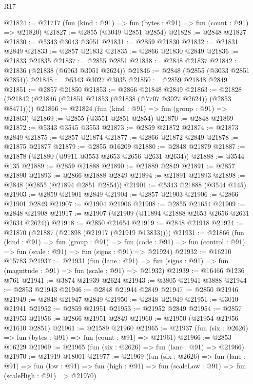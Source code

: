 \begin{lexlean}{R17}
\begin{coremodule}
@21824 := @21717 (fun (kind : @91) => fun (bytes : @91) => fun (count : @91) => @21820)
@21827 := @2855 (@3049 @2851 @2854)
@21828 := @2848 @21827
@21830 := @5343 @3043 @3051
@21831 := @2859 @21830
@21832 := @21831 @2849
@21833 := @2857 @21832
@21835 := @2866 @21830 @2849
@21836 := @21833 @21835
@21837 := @2855 @2851
@21838 := @2848 @21837
@21842 := @21836 (@21838 (@6963 @3051 @2624))
@21846 := @2848 (@2855 (@3033 @2851 @2854))
@21848 := @5343 @3027 @3035
@21850 := @2859 @21848 @2849
@21851 := @2857 @21850
@21853 := @2866 @21848 @2849
@21863 := @21828 (@21842 (@21846 (@21851 @21853 (@21838 (@7707 @3027 @2624)) (@2853 @8471))))
@21866 := @21824 (fun (kind : @91) => fun (group : @91) => @21863)
@21869 := @2855 (@3551 @2851 @2854)
@21870 := @2848 @21869
@21872 := @5343 @3545 @3553
@21873 := @2859 @21872
@21874 := @21873 @2849
@21875 := @2857 @21874
@21877 := @2866 @21872 @2849
@21878 := @21875 @21877
@21879 := @2855 @16209
@21880 := @2848 @21879
@21887 := @21878 (@21880 (@9911 @3553 @2653 @2656 @2631 @2634))
@21888 := @3544 @135
@21889 := @2859 @21888
@21890 := @21889 @2849
@21891 := @2857 @21890
@21893 := @2866 @21888 @2849
@21894 := @21891 @21893
@21898 := @2848 (@2855 (@21894 @2851 @2854))
@21901 := @5343 @21888 (@3544 @145)
@21903 := @2859 @21901 @2849
@21904 := @2857 @21903
@21906 := @2866 @21901 @2849
@21907 := @21904 @21906
@21908 := @2855 @21654
@21909 := @2848 @21908
@21917 := @21907 (@21909 (@11894 @21888 @2653 @2656 @2631 @2634 @2624))
@21918 := @2850 @21654
@21919 := @2848 @21918
@21924 := @21870 (@21887 (@21898 (@21917 (@21919 @13833))))
@21931 := @21866
    (fun (kind : @91) =>
    fun (group : @91) =>
    fun (code : @91) => fun (control : @91) => fun (scale : @91) => fun (signs : @91) => @21924)
@21932 := @16210 @15783
@21937 := @21931
    (fun (lane : @91) => fun (signs : @91) => fun (magnitude : @91) => fun (scale : @91) => @21932)
@21939 := @16466 @1236 @761
@21941 := @3874 @21939 @2624
@21943 := @3805 @21941 @3888
@21944 := @2853 @21943
@21946 := @2848 @21944 @2849
@21947 := @2850 @21946
@21949 := @2848 @21947 @2849
@21950 := @2848 @21949
@21951 := @3010 @21941
@21952 := @2859 @21951
@21953 := @21952 @2849
@21954 := @2857 @21953
@21956 := @2866 @21951 @2849
@21960 := @21950 (@21954 @21956 @21610 @2851)
@21961 := @21589 @21960
@21965 := @21937 (fun (six : @2626) => fun (bytes : @91) => fun (count : @91) => @21961)
@21966 := @2853 @16229
@21969 := @21965 (fun (six : @2626) => fun (lane : @91) => @21966)
@21970 := @21919 @18001
@21977 := @21969
    (fun (six : @2626) =>
    fun (lane : @91) =>
    fun (low : @91) => fun (high : @91) => fun (scaleLow : @91) => fun (scaleHigh : @91) => @21970)

\end{coremodule}
\end{lexlean}
